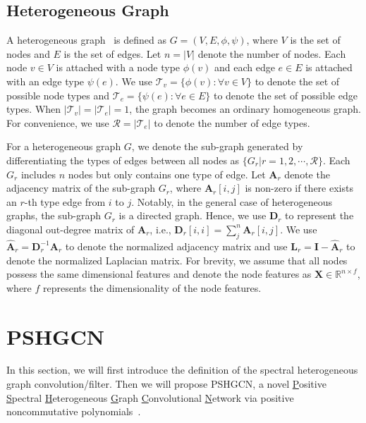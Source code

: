 \documentclass{article}
\begin{document}
\subsection{Heterogeneous Graph}
A heterogeneous graph~\cite{hetero_graph} is defined as $G=(V,E,\phi , \psi)$, where $V$ is the set of nodes and $E$ is the set of edges. Let $n=\lvert V \rvert$ denote the number of nodes.
Each node $v \in V$ is attached with a node type $\phi(v)$ and each edge $e \in E$ is attached with an edge type $\psi(e)$. We use $\mathcal{T}_v =\{\phi(v): \forall v \in V\}$ to denote the set of possible node types and $\mathcal{T}_e = \{\psi(e):\forall e \in E\}$ to denote the set of possible edge types. When $\lvert \mathcal{T}_v \rvert=\lvert \mathcal{T}_e \rvert=1 $, the graph becomes an ordinary homogeneous graph. For  convenience, we use $\mathcal{R}=\lvert \mathcal{T}_e \rvert$ to denote the number of edge types.

For a heterogeneous graph $G$, we denote the sub-graph generated by differentiating the types of edges between all nodes as $\{G_r|r=1,2,\cdots,\mathcal{R}\}$. Each $G_r$ includes $n$ nodes but only contains one type of edge. Let $\mathbf{A}_r$ denote the adjacency matrix of the sub-graph $G_r$, where $\mathbf{A}_r[i,j]$ is non-zero if there exists an $r$-th type edge from $i$ to $j$. Notably, in the general case of heterogeneous graphs, the sub-graph $G_r$ is a directed graph. Hence, we use $\mathbf{D}_r$ to represent the diagonal out-degree matrix of $\mathbf{A}_r$, i.e., $\mathbf{D}_{r}[i,i]=\sum\nolimits_{j}^n \mathbf{A}_r[i,j]$. We use $\hat{\mathbf{A}}_r=\mathbf{D}_{r}^{-1}\mathbf{A}_r$ to denote the normalized adjacency matrix and use $\mathbf{L}_r=\mathbf{I}-\hat{\mathbf{A}}_r$ to denote the normalized Laplacian matrix. For brevity, we assume that all nodes possess the same dimensional features and denote the node features as $\mathbf{X}\in \mathbb{R}^{n \times f}$, where $f$ represents the dimensionality of the node features. 





\section{PSHGCN}
In this section, we will first introduce the definition of the spectral heterogeneous graph convolution/filter. Then we will propose PSHGCN, a novel \underline{P}ositive \underline{S}pectral \underline{H}eterogeneous \underline{G}raph \underline{C}onvolutional \underline{N}etwork via positive noncommutative polynomials~\cite{positive-poly}.
\end{document}
